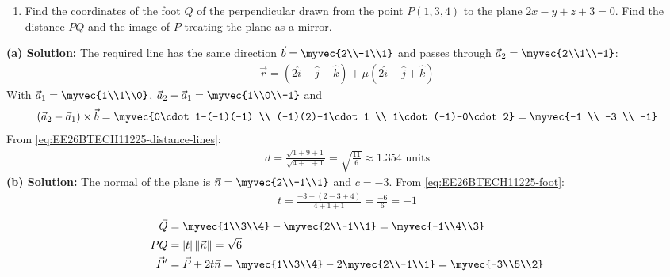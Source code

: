 \begin{enumerate}[label=\thesubsection.\arabic*, ref=\thesubsection.\theenumi]
\begin{enumerate}[label=(\alph*), leftmargin=1.5em, labelsep=0.5em]
        \item Find the coordinates of the foot $Q$ of the perpendicular drawn from the point $P(1,3,4)$ to the plane $2x-y+z+3=0$. Find the distance $PQ$ and the image of $P$ treating the plane as a mirror.
    \end{enumerate} \vspace{2pt}
    \textbf{(a) Solution:} The required line has the same direction $\vec{b} = \myvec{2\\-1\\1}$ and passes through $\vec{a}_2 = \myvec{2\\1\\-1}$:
\begin{align}
    \vec{r} = (2\hat{i}+\hat{j}-\hat{k}) + \mu(2\hat{i}-\hat{j}+\hat{k})
\end{align}
With $\vec{a}_1 = \myvec{1\\1\\0}$, $\vec{a}_2-\vec{a}_1 = \myvec{1\\0\\-1}$ and
\begin{align}
    (\vec{a}_2-\vec{a}_1)\times\vec{b} = \myvec{0\cdot1-(-1)(-1) \\ (-1)(2)-1\cdot1 \\ 1\cdot(-1)-0\cdot2} = \myvec{-1 \\ -3 \\ -1}
\end{align}
From \eqref{eq:EE26BTECH11225-distance-lines}:
\begin{align}
    d = \frac{\sqrt{1+9+1}}{\sqrt{4+1+1}} = \sqrt{\frac{11}{6}} \approx 1.354\text{ units}
\end{align}
\textbf{(b) Solution:} The normal of the plane is $\vec{n} = \myvec{2\\-1\\1}$ and $c=-3$. From \eqref{eq:EE26BTECH11225-foot}:
\begin{align}
    t = \frac{-3-(2-3+4)}{4+1+1} = \frac{-6}{6} = -1
\end{align}
\begin{align}
    \vec{Q} &= \myvec{1\\3\\4} - \myvec{2\\-1\\1} = \myvec{-1\\4\\3} \\
    PQ &= |t|\,\|\vec{n}\| = \sqrt{6} \\
    \vec{P}' &= \vec{P}+2t\vec{n} = \myvec{1\\3\\4} - 2\myvec{2\\-1\\1} = \myvec{-3\\5\\2}

\end{align}
\end{enumerate}
